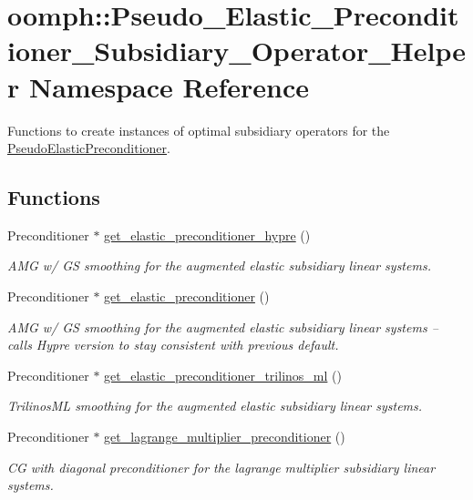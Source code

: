 \hypertarget{namespaceoomph_1_1Pseudo__Elastic__Preconditioner__Subsidiary__Operator__Helper}{}\section{oomph\+:\+:Pseudo\+\_\+\+Elastic\+\_\+\+Preconditioner\+\_\+\+Subsidiary\+\_\+\+Operator\+\_\+\+Helper Namespace Reference}
\label{namespaceoomph_1_1Pseudo__Elastic__Preconditioner__Subsidiary__Operator__Helper}


Functions to create instances of optimal subsidiary operators for the \hyperlink{classoomph_1_1PseudoElasticPreconditioner}{Pseudo\+Elastic\+Preconditioner}.  


\subsection*{Functions}
\begin{DoxyCompactItemize}
\item 
Preconditioner $\ast$ \hyperlink{namespaceoomph_1_1Pseudo__Elastic__Preconditioner__Subsidiary__Operator__Helper_aedfcfd828b599566ad795d22850a6960}{get\+\_\+elastic\+\_\+preconditioner\+\_\+hypre} ()
\begin{DoxyCompactList}\small\item\em A\+MG w/ GS smoothing for the augmented elastic subsidiary linear systems. \end{DoxyCompactList}\item 
Preconditioner $\ast$ \hyperlink{namespaceoomph_1_1Pseudo__Elastic__Preconditioner__Subsidiary__Operator__Helper_a89297aa38d1b277fe3db3c0281aa4924}{get\+\_\+elastic\+\_\+preconditioner} ()
\begin{DoxyCompactList}\small\item\em A\+MG w/ GS smoothing for the augmented elastic subsidiary linear systems -- calls Hypre version to stay consistent with previous default. \end{DoxyCompactList}\item 
Preconditioner $\ast$ \hyperlink{namespaceoomph_1_1Pseudo__Elastic__Preconditioner__Subsidiary__Operator__Helper_ac5df49cd5860e1cd611fa73cc0f60bc6}{get\+\_\+elastic\+\_\+preconditioner\+\_\+trilinos\+\_\+ml} ()
\begin{DoxyCompactList}\small\item\em Trilinos\+ML smoothing for the augmented elastic subsidiary linear systems. \end{DoxyCompactList}\item 
Preconditioner $\ast$ \hyperlink{namespaceoomph_1_1Pseudo__Elastic__Preconditioner__Subsidiary__Operator__Helper_a00a15f5ea18cab0665797ba03a9c9286}{get\+\_\+lagrange\+\_\+multiplier\+\_\+preconditioner} ()
\begin{DoxyCompactList}\small\item\em CG with diagonal preconditioner for the lagrange multiplier subsidiary linear systems. \end{DoxyCompactList}\end{DoxyCompactItemize}


